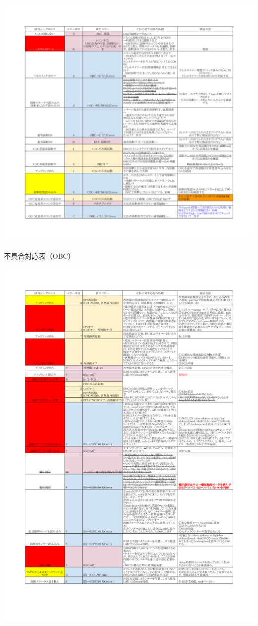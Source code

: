 \begin{itemize}
	\begin{table}[H]
		\centering
		\includegraphics[scale=0.7]{03/fig/t3-4-Ini-1.pdf}
		\caption{不具合対応表（OBC）}
		\label{table3-4-Ini-1}
	\end{table}
	\begin{table}[H]
	\centering
	\includegraphics[scale=0.7]{03/fig/t3-4-Ini-2.pdf}

\end{table}
\end{itemize}
